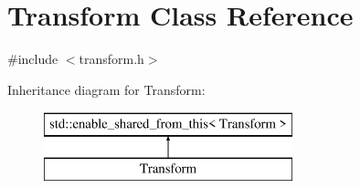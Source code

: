 \hypertarget{class_transform}{}\section{Transform Class Reference}
\label{class_transform}


{\ttfamily \#include $<$transform.\+h$>$}

Inheritance diagram for Transform\+:\begin{figure}[H]
\begin{center}
\leavevmode
\includegraphics[height=2.000000cm]{class_transform}
\end{center}
\end{figure}
